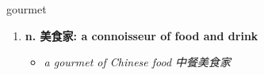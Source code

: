 
\begin{frame}
{\huge gourmet}
\begin{center}
\begin{enumerate}\Large
  \item \textbf{n. 美食家: a connoisseur of food and drink}
  \begin{itemize}
    \item \em{\Large{a gourmet of Chinese food 中餐美食家}}
  \end{itemize}
\end{enumerate}
\end{center}
\end{frame}
